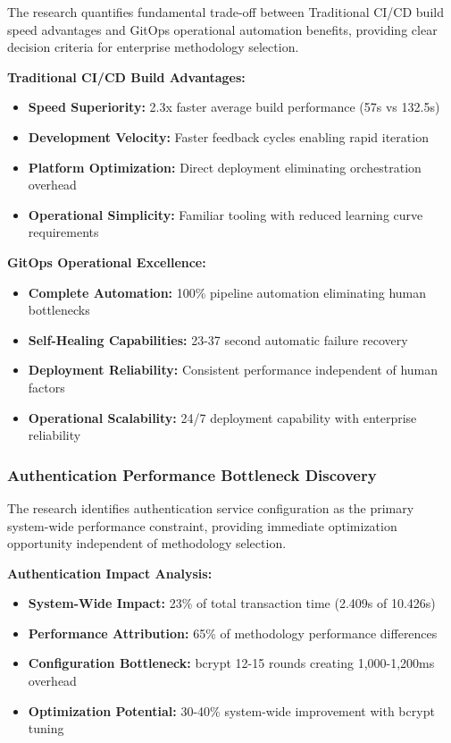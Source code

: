 The research quantifies fundamental trade-off between Traditional CI/CD build speed advantages and GitOps operational automation benefits, providing clear decision criteria for enterprise methodology selection.

\textbf{Traditional CI/CD Build Advantages:}
\begin{itemize}
\item \textbf{Speed Superiority:} 2.3x faster average build performance (57s vs 132.5s)
\item \textbf{Development Velocity:} Faster feedback cycles enabling rapid iteration
\item \textbf{Platform Optimization:} Direct deployment eliminating orchestration overhead
\item \textbf{Operational Simplicity:} Familiar tooling with reduced learning curve requirements
\end{itemize}

\textbf{GitOps Operational Excellence:}
\begin{itemize}
\item \textbf{Complete Automation:} 100\% pipeline automation eliminating human bottlenecks
\item \textbf{Self-Healing Capabilities:} 23-37 second automatic failure recovery
\item \textbf{Deployment Reliability:} Consistent performance independent of human factors
\item \textbf{Operational Scalability:} 24/7 deployment capability with enterprise reliability
\end{itemize}

\subsubsection{Authentication Performance Bottleneck Discovery}

The research identifies authentication service configuration as the primary system-wide performance constraint, providing immediate optimization opportunity independent of methodology selection.

\textbf{Authentication Impact Analysis:}
\begin{itemize}
\item \textbf{System-Wide Impact:} 23\% of total transaction time (2.409s of 10.426s)
\item \textbf{Performance Attribution:} 65\% of methodology performance differences
\item \textbf{Configuration Bottleneck:} bcrypt 12-15 rounds creating 1,000-1,200ms overhead
\item \textbf{Optimization Potential:} 30-40\% system-wide improvement with bcrypt tuning
\end{itemize}

